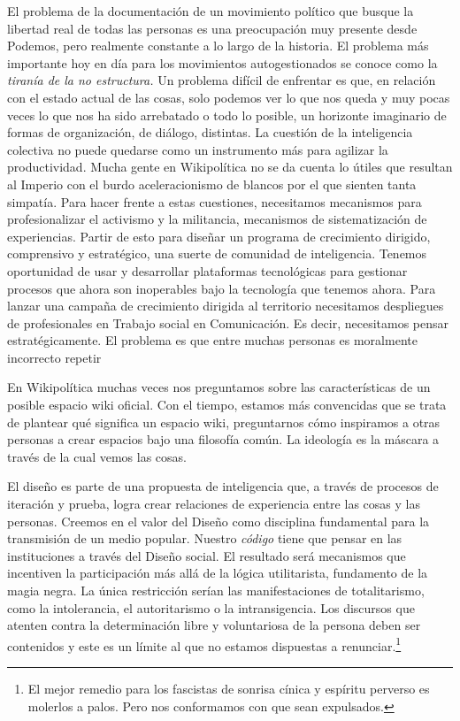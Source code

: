 El problema de la documentación de un movimiento político que busque la libertad real de todas las personas es una preocupación muy presente desde Podemos, pero realmente constante a lo largo de la historia. El problema más importante hoy en día para los movimientos autogestionados se conoce como la \emph{tiranía de la no estructura.} Un problema difícil de enfrentar es que, en relación con el estado actual de las cosas, solo podemos ver lo que nos queda y muy pocas veces lo que nos ha sido arrebatado o todo lo posible, un horizonte imaginario de formas de organización, de diálogo, distintas. La cuestión de la inteligencia colectiva no puede quedarse como un instrumento más para agilizar la productividad. Mucha gente en Wikipolítica no se da cuenta lo útiles que resultan al Imperio con el burdo aceleracionismo de blancos por el que sienten tanta simpatía. Para hacer frente a estas cuestiones, necesitamos mecanismos para profesionalizar el activismo y la militancia, mecanismos de sistematización de experiencias. Partir de esto para diseñar un programa de crecimiento dirigido, comprensivo y estratégico, una suerte de comunidad de inteligencia. Tenemos oportunidad de usar y desarrollar plataformas tecnológicas para gestionar procesos que ahora son inoperables bajo la tecnología que tenemos ahora. Para lanzar una campaña de crecimiento dirigida al territorio necesitamos despliegues de profesionales en Trabajo social en Comunicación. Es decir, necesitamos pensar estratégicamente. El problema es que entre muchas personas es moralmente incorrecto repetir

En Wikipolítica muchas veces nos preguntamos sobre las características de un posible espacio wiki oficial. Con el tiempo, estamos más convencidas que se trata de plantear qué significa un espacio wiki, preguntarnos cómo inspiramos a otras personas a crear espacios bajo una filosofía común. La ideología es la máscara a través de la cual vemos las cosas.

El diseño es parte de una propuesta de inteligencia que, a través de procesos de iteración y prueba, logra crear relaciones de experiencia entre las cosas y las personas. Creemos en el valor del Diseño como disciplina fundamental para la transmisión de un medio popular. Nuestro \emph{código} tiene que pensar en las instituciones a través del Diseño social. El resultado será mecanismos que incentiven la participación más allá de la lógica utilitarista, fundamento de la magia negra. La única restricción serían las manifestaciones de totalitarismo, como la intolerancia, el autoritarismo o la intransigencia. Los discursos que atenten contra la determinación libre y voluntariosa de la persona deben ser contenidos y este es un límite al que no estamos dispuestas a renunciar.\footnote{El mejor remedio para los fascistas de sonrisa cínica y espíritu perverso es molerlos a palos. Pero nos conformamos con que sean expulsados.}

